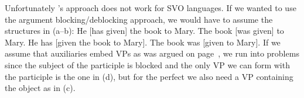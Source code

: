 
Unfortunately \citeauthor{Haider86}'s approach does not work for SVO languages. If we wanted to use
the argument blocking/deblocking approach, we would have to assume the structures in (a--b):
\eal
\ex He [has given] the book to Mary.
\ex The book [was given] to Mary.
\ex He has [given the book to Mary].
\ex The book was [given to Mary].
\zl
If we assume that auxiliaries embed VPs as was argued on page~\pageref{page-English-Aux-VPs}, we run
into problems since the subject of the participle is blocked and the only VP we can form with the
participle is the one in (d), but for the perfect we also need a VP containing the object as
in (c).












